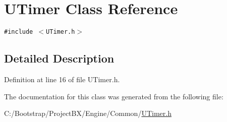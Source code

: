 \hypertarget{class_u_timer}{
\section{UTimer Class Reference}
\label{class_u_timer}
}
{\tt \#include $<$UTimer.h$>$}



\subsection{Detailed Description}


Definition at line 16 of file UTimer.h.

The documentation for this class was generated from the following file:\begin{CompactItemize}
\item 
C:/Bootstrap/ProjectBX/Engine/Common/\hyperlink{_u_timer_8h}{UTimer.h}\end{CompactItemize}
